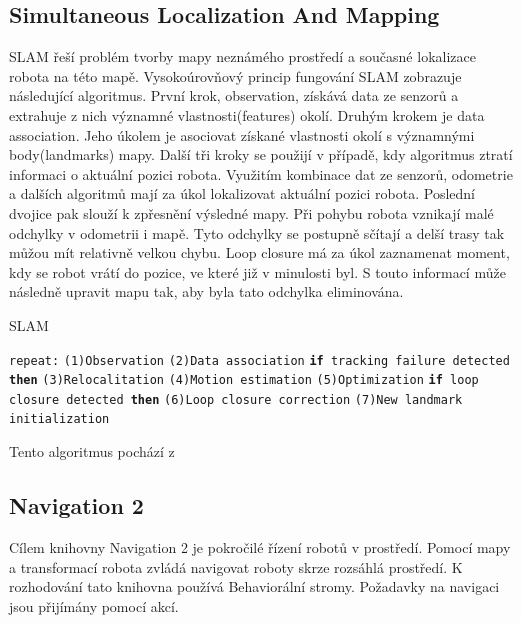 \subsection*{Simultaneous Localization And Mapping}
SLAM řeší problém tvorby mapy neznámého prostředí a současné lokalizace robota na této mapě. Vysokoúrovňový princip fungování SLAM zobrazuje následující algoritmus. První krok, observation, získává data ze senzorů a extrahuje z nich významné vlastnosti(features) okolí. Druhým krokem je data association. Jeho úkolem je asociovat získané vlastnosti okolí s významnými body(landmarks) mapy. Další tři kroky se použijí v případě, kdy algoritmus ztratí informaci o aktuální pozici robota. Využitím kombinace dat ze senzorů, odometrie a dalších algoritmů mají za úkol lokalizovat aktuální pozici robota. Poslední dvojice pak slouží k zpřesnění výsledné mapy. Při pohybu robota vznikají malé odchylky v odometrii i mapě. Tyto odchylky se postupně sčítají a delší trasy tak můžou mít relativně velkou chybu. Loop closure má za úkol zaznamenat moment, kdy se robot vrátí do pozice, ve které již v minulosti byl. S touto informací může následně upravit mapu tak, aby byla tato odchylka eliminována. \cite[str:~414-418]{slam}

\begin{algorithm}[h!]
	\label{}
	\caption{\textsc{SLAM}}
	
	\DontPrintSemicolon
	\SetAlgoNoLine
	\SetNlSty{}{}{:}
	\SetNlSkip{-1.1em}
	
	\BlankLine \Indp\Indpp
	
	\texttt{repeat:}\;
	\Indp\Indp
	\texttt{(1)Observation}\;	
	\texttt{(2)Data association}\;
	\texttt{\textbf{if} tracking failure detected \textbf{then}}\;
	\Indp\Indp
	\texttt{(3)Relocalitation}\;
	\texttt{(4)Motion estimation}\;
	\texttt{(5)Optimization}\;
	\Indm\Indm
	\texttt{\textbf{if} loop closure detected \textbf{then}}\;
	\Indp\Indp
	\texttt{(6)Loop closure correction}\;
	\texttt{(7)New landmark initialization}\;
	
\end{algorithm}
\begin{center}
	\vspace{-2em}
	Tento algoritmus pochází z \cite[str:~414]{slam}
\end{center}

\subsection*{Navigation 2}
Cílem knihovny Navigation 2 je pokročilé řízení robotů v prostředí. Pomocí mapy a transformací robota zvládá navigovat roboty skrze rozsáhlá prostředí. K rozhodování tato knihovna používá Behaviorální stromy. Požadavky na navigaci jsou přijímány pomocí akcí. \cite{nav2_documentation}

